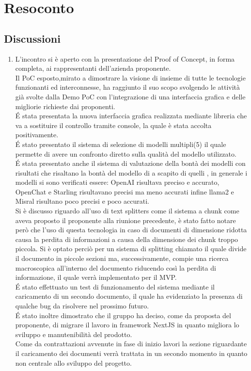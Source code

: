 \section{Resoconto} \label{sec:resoconto}
\subsection{Discussioni} \label{subsec:resdiscussione}
\begin{enumerate}
    \item L'incontro si è aperto con la presentazione del Proof of Concept, in forma completa, ai rappresentanti dell'azienda proponente.\\Il PoC esposto,mirato a dimostrare la visione di insieme di tutte le tecnologie funzionanti ed interconnesse, ha raggiunto il suo scopo svolgendo le attività già svolte dalla Demo PoC con l'integrazione di una interfaccia grafica e delle migliorie richieste dai proponenti.\\É stata presentata la nuova interfaccia grafica realizzata mediante libreria  che va a sostituire il controllo tramite console, la quale è stata accolta positivamente.\\É stato presentato il sistema di selezione di modelli multipli(5) il quale permette di avere un confronto diretto sulla qualità del modello utilizzato.\\É stata presentato anche il sistema di valutazione della bontà dei modelli con risultati che risaltano la bontà del modello di  a scapito di quelli , in generale i modelli si sono verificati essere: OpenAI risultava preciso e accurato, OpenChat e Starling risultavano precisi ma meno accurati infine llama2 e Misral risultano poco precisi e poco accurati.\\Si è discusso riguardo all'uso di text splitters come il sistema a chunk come aveva proposto il proponente alla riunione precedente, è stato fatto notare però che l'uso di questa tecnologia in caso di documenti di dimensione ridotta causa la perdita di informazioni a causa della dimensione dei chunk troppo piccola. Si è optato perciò per un sistema di splitting chiamato  il quale divide il documento in piccole sezioni ma, successivamente, compie una ricerca macroscopica all'interno del documento riducendo così la perdita di informazione, il quale verrà implementato per il MVP.\\É stato effettuato un test di funzionamento del sistema mediante il caricamento di un secondo documento, il quale ha evidenziato la presenza di qualche bug da risolvere nel prossimo futuro.\\É stato inoltre dimostrato che il gruppo ha deciso, come da proposta del proponente, di migrare il lavoro in framework NextJS in quanto migliora lo sviluppo e manutenibilità del prodotto.\\Come da contrattazioni avvenute in fase di inizio lavori la sezione riguardante il caricamento dei documenti verrà trattata in un secondo momento in quanto non centrale allo sviluppo del progetto.

\end{enumerate}
